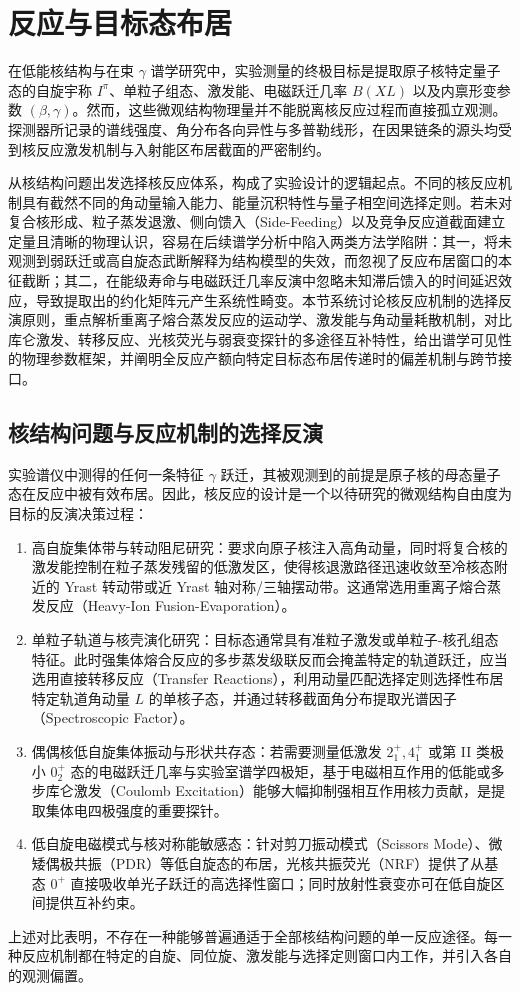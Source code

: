 \section{反应与目标态布居}\label{sec:5-1}

在低能核结构与在束 $\gamma$ 谱学研究中，实验测量的终极目标是提取原子核特定量子态的自旋宇称 $I^\pi$、单粒子组态、激发能、电磁跃迁几率 $B(XL)$ 以及内禀形变参数 $(\beta, \gamma)$。然而，这些微观结构物理量并不能脱离核反应过程而直接孤立观测。探测器所记录的谱线强度、角分布各向异性与多普勒线形，在因果链条的源头均受到核反应激发机制与入射能区布居截面的严密制约。

从核结构问题出发选择核反应体系，构成了实验设计的逻辑起点。不同的核反应机制具有截然不同的角动量输入能力、能量沉积特性与量子相空间选择定则。若未对复合核形成、粒子蒸发退激、侧向馈入（Side-Feeding）以及竞争反应道截面建立定量且清晰的物理认识，容易在后续谱学分析中陷入两类方法学陷阱：其一，将未观测到弱跃迁或高自旋态武断解释为结构模型的失效，而忽视了反应布居窗口的本征截断；其二，在能级寿命与电磁跃迁几率反演中忽略未知滞后馈入的时间延迟效应，导致提取出的约化矩阵元产生系统性畸变。本节系统讨论核反应机制的选择反演原则，重点解析重离子熔合蒸发反应的运动学、激发能与角动量耗散机制，对比库仑激发、转移反应、光核荧光与弱衰变探针的多途径互补特性，给出谱学可见性的物理参数框架，并阐明全反应产额向特定目标态布居传递时的偏差机制与跨节接口。

\subsection{核结构问题与反应机制的选择反演}\label{subsec:5-1-1}

实验谱仪中测得的任何一条特征 $\gamma$ 跃迁，其被观测到的前提是原子核的母态量子态在反应中被有效布居。因此，核反应的设计是一个以待研究的微观结构自由度为目标的反演决策过程：
\begin{enumerate}
\item 高自旋集体带与转动阻尼研究：要求向原子核注入高角动量，同时将复合核的激发能控制在粒子蒸发残留的低激发区，使得核退激路径迅速收敛至冷核态附近的 Yrast 转动带或近 Yrast 轴对称/三轴摆动带。这通常选用重离子熔合蒸发反应（Heavy-Ion Fusion-Evaporation）。
\item 单粒子轨道与核壳演化研究：目标态通常具有准粒子激发或单粒子-核孔组态特征。此时强集体熔合反应的多步蒸发级联反而会掩盖特定的轨道跃迁，应当选用直接转移反应（Transfer Reactions），利用动量匹配选择定则选择性布居特定轨道角动量 $L$ 的单核子态，并通过转移截面角分布提取光谱因子（Spectroscopic Factor）。
\item 偶偶核低自旋集体振动与形状共存态：若需要测量低激发 $2^+_1, 4^+_1$ 或第 II 类极小 $0^+_2$ 态的电磁跃迁几率与实验室谱学四极矩，基于电磁相互作用的低能或多步库仑激发（Coulomb Excitation）能够大幅抑制强相互作用核力贡献，是提取集体电四极强度的重要探针。
\item 低自旋电磁模式与核对称能敏感态：针对剪刀振动模式（Scissors Mode）、微矮偶极共振（PDR）等低自旋态的布居，光核共振荧光（NRF）提供了从基态 $0^+$ 直接吸收单光子跃迁的高选择性窗口；同时放射性衰变亦可在低自旋区间提供互补约束。
\end{enumerate}
上述对比表明，不存在一种能够普遍通适于全部核结构问题的单一反应途径。每一种反应机制都在特定的自旋、同位旋、激发能与选择定则窗口内工作，并引入各自的观测偏置。

